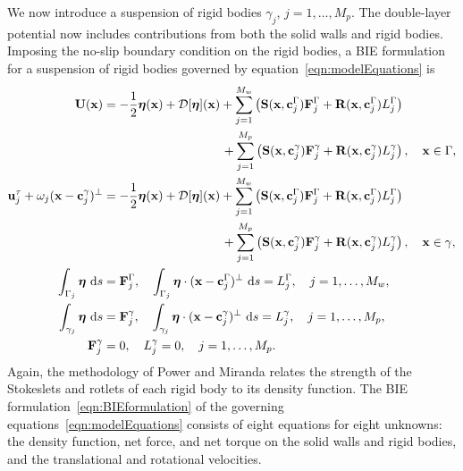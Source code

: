 \documentclass[AMA,STIX1COL]{WileyNJD-v2}
\begin{document}
We now introduce a suspension of rigid bodies $\gamma_j$,
$j=1,\ldots,M_p$.  The double-layer potential now includes contributions
from both the solid walls and rigid bodies.  Imposing the no-slip
boundary condition on the rigid bodies, a BIE formulation for a
suspension of rigid bodies governed by
equation~\eqref{eqn:modelEquations} is
\begin{subequations}
  \label{eqn:BIEformulation}
  \begin{align}
    {\mathbf{U}}({\mathbf{x}}) &= -\frac{1}{2}{\boldsymbol\eta}({\mathbf{x}}) + {\mathcal{D}}[{\boldsymbol\eta}]({\mathbf{x}}) +
    \sum_{j=1}^{M_w} \left(\mathbf{S}({\mathbf{x}},{\mathbf{c}}^\Gamma_j){\mathbf{F}}^\Gamma_j + 
      \mathbf{R}({\mathbf{x}},{\mathbf{c}}^\Gamma_j)L^\Gamma_j\right)  \nonumber \\
&\hspace{96pt}+\sum_{j=1}^{M_p} \left(\mathbf{S}({\mathbf{x}},{\mathbf{c}}^\gamma_j){\mathbf{F}}^\gamma_j +
\mathbf{R}({\mathbf{x}},{\mathbf{c}}^\gamma_j)L^\gamma_j\right),
    \quad {\mathbf{x}} \in \Gamma, \label{eqn:BIEformulation1} \\
  {\mathbf{u}}^\tau_j + \omega_j({\mathbf{x}} - {\mathbf{c}}_j^\gamma)^\perp &=
    -\frac{1}{2}{\boldsymbol\eta}({\mathbf{x}}) + {\mathcal{D}}[{\boldsymbol\eta}]({\mathbf{x}}) + 
    \sum_{j=1}^{M_w} \left(\mathbf{S}({\mathbf{x}},{\mathbf{c}}^\Gamma_j){\mathbf{F}}^\Gamma_j + 
      \mathbf{R}({\mathbf{x}},{\mathbf{c}}^\Gamma_j)L^\Gamma_j\right) \nonumber \\
&\hspace{96pt}+\sum_{j=1}^{M_p} \left(\mathbf{S}({\mathbf{x}},{\mathbf{c}}^\gamma_j){\mathbf{F}}^\gamma_j +
\mathbf{R}({\mathbf{x}},{\mathbf{c}}^\gamma_j)L^\gamma_j\right),
    \quad {\mathbf{x}} \in \gamma, \label{eqn:BIEformulation2} \\
  \int_{\Gamma_j} {\boldsymbol\eta}~\text{d}s &= {\mathbf{F}}^\Gamma_j, \quad
  \int_{\Gamma_j} {\boldsymbol\eta}\cdot ({\mathbf{x}} - {\mathbf{c}}^\Gamma_j)^\perp~\text{d}s =
  L^\Gamma_j, \quad j=1,\ldots,M_w, \label{eqn:BIEformulation3} \\
  \int_{\gamma_j} {\boldsymbol\eta}~\text{d}s &= {\mathbf{F}}^\gamma_j, \quad
  \int_{\gamma_j} {\boldsymbol\eta}\cdot ({\mathbf{x}} - {\mathbf{c}}^\gamma_j)^\perp~\text{d}s =
  L^\gamma_j,\quad j=1,\ldots,M_p, \label{eqn:BIEformulation4} \\
  {\mathbf{F}}^\gamma_j &= 0, \quad L^\gamma_j = 0,\quad j=1,\ldots,M_p.
  \label{eqn:BIEformulation5}
\end{align}
\end{subequations}
Again, the methodology of Power and Miranda relates the strength of the
Stokeslets and rotlets of each rigid body to its density function.  The
BIE formulation~\eqref{eqn:BIEformulation} of the governing
equations~\eqref{eqn:modelEquations} consists of eight equations for
eight unknowns: the density function, net force, and net torque on the
solid walls and rigid bodies, and the translational and rotational
velocities.
\end{document}
